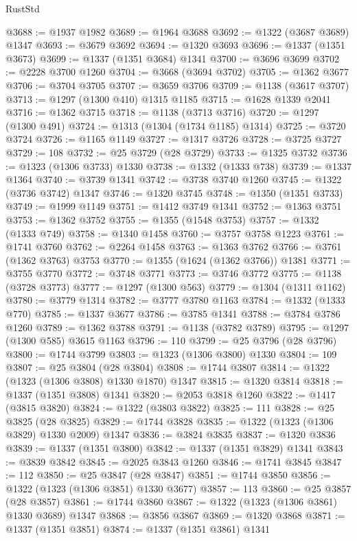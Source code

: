 \begin{lexlean}{RustStd}
\begin{coremodule}
@3688 := @1937 @1982
@3689 := @1964 @3688
@3692 := @1322 (@3687 @3689) @1347
@3693 := @3679 @3692
@3694 := @1320 @3693
@3696 := @1337 (@1351 @3673)
@3699 := @1337 (@1351 @3684) @1341
@3700 := @3696 @3699
@3702 := @2228 @3700 @1260
@3704 := @3668 (@3694 @3702)
@3705 := @1362 @3677
@3706 := @3704 @3705
@3707 := @3659 @3706
@3709 := @1138 (@3617 @3707)
@3713 := @1297 (@1300 @410) @1315 @1185
@3715 := @1628 @1339 @2041
@3716 := @1362 @3715
@3718 := @1138 (@3713 @3716)
@3720 := @1297 (@1300 @491)
@3724 := @1313 (@1304 (@1734 @1185) @1314)
@3725 := @3720 @3724
@3726 := @1165 @1149
@3727 := @1317 @3726
@3728 := @3725 @3727
@3729 := 108
@3732 := @25 @3729 (@28 @3729)
@3733 := @1325 @3732
@3736 := @1323 (@1306 @3733) @1330
@3738 := @1332 (@1333 @738)
@3739 := @1337 @1364
@3740 := @3739 @1341
@3742 := @3738 @3740 @1260
@3745 := @1322 (@3736 @3742) @1347
@3746 := @1320 @3745
@3748 := @1350 (@1351 @3733)
@3749 := @1999 @1149
@3751 := @1412 @3749 @1341
@3752 := @1363 @3751
@3753 := @1362 @3752
@3755 := @1355 (@1548 @3753)
@3757 := @1332 (@1333 @749)
@3758 := @1340 @1458
@3760 := @3757 @3758 @1223
@3761 := @1741 @3760
@3762 := @2264 @1458
@3763 := @1363 @3762
@3766 := @3761 (@1362 @3763) @3753
@3770 := @1355 (@1624 (@1362 @3766)) @1381
@3771 := @3755 @3770
@3772 := @3748 @3771
@3773 := @3746 @3772
@3775 := @1138 (@3728 @3773)
@3777 := @1297 (@1300 @563)
@3779 := @1304 (@1311 @1162)
@3780 := @3779 @1314
@3782 := @3777 @3780 @1163
@3784 := @1332 (@1333 @770)
@3785 := @1337 @3677
@3786 := @3785 @1341
@3788 := @3784 @3786 @1260
@3789 := @1362 @3788
@3791 := @1138 (@3782 @3789)
@3795 := @1297 (@1300 @585) @3615 @1163
@3796 := 110
@3799 := @25 @3796 (@28 @3796)
@3800 := @1744 @3799
@3803 := @1323 (@1306 @3800) @1330
@3804 := 109
@3807 := @25 @3804 (@28 @3804)
@3808 := @1744 @3807
@3814 := @1322 (@1323 (@1306 @3808) @1330 @1870) @1347
@3815 := @1320 @3814
@3818 := @1337 (@1351 @3808) @1341
@3820 := @2053 @3818 @1260
@3822 := @1417 (@3815 @3820)
@3824 := @1322 (@3803 @3822)
@3825 := 111
@3828 := @25 @3825 (@28 @3825)
@3829 := @1744 @3828
@3835 := @1322 (@1323 (@1306 @3829) @1330 @2009) @1347
@3836 := @3824 @3835
@3837 := @1320 @3836
@3839 := @1337 (@1351 @3800)
@3842 := @1337 (@1351 @3829) @1341
@3843 := @3839 @3842
@3845 := @2025 @3843 @1260
@3846 := @1741 @3845
@3847 := 112
@3850 := @25 @3847 (@28 @3847)
@3851 := @1744 @3850
@3856 := @1322 (@1323 (@1306 @3851) @1330 @3677)
@3857 := 113
@3860 := @25 @3857 (@28 @3857)
@3861 := @1744 @3860
@3867 := @1322 (@1323 (@1306 @3861) @1330 @3689) @1347
@3868 := @3856 @3867
@3869 := @1320 @3868
@3871 := @1337 (@1351 @3851)
@3874 := @1337 (@1351 @3861) @1341

\end{coremodule}
\end{lexlean}
